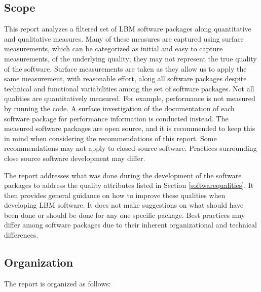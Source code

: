 \documentclass[12pt, notitlepage]{article}
\begin{document}
\subsection{Scope}

This report analyzes a filtered set of LBM software packages along quantitative and qualitative measures. Many of these measures are captured using surface measurements, which can be categorized as initial and easy to capture measurements, of the underlying quality; they may not represent the true quality of the software. Surface measurements are taken as they allow us to apply the same measurement, with reasonable effort, along all software packages despite technical and functional variabilities among the set of software packages. Not all qualities are quantitatively measured. For example, performance is not measured by running the code. A surface investigation of the documentation of each software package for performance information is conducted instead. The measured software packages are open source, and it is recommended to keep this in mind when considering the recommendations of this report. Some recommendations may not apply to closed-source software. Practices surrounding close source software development may differ.

The report addresses what was done during the development of the software packages to address the quality attributes listed in Section \ref{softwarequalities}. It then provides general guidance on how to improve these qualities when developing LBM software. It does not make suggestions on what should have been done or should be done for any one specific package. Best practices may differ among software packages due to their inherent organizational and technical differences. 

\subsection{Organization}

The report is organized as follows:
\end{document}
